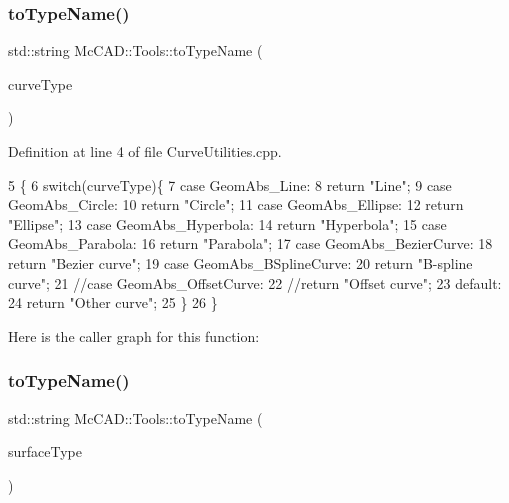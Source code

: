 \subsubsection{\texorpdfstring{to\+Type\+Name()}{toTypeName()}\hspace{0.1cm}{\footnotesize\ttfamily [1/2]}}
{\footnotesize\ttfamily std\+::string Mc\+C\+A\+D\+::\+Tools\+::to\+Type\+Name (\begin{DoxyParamCaption}\item[{Geom\+Abs\+\_\+\+Curve\+Type}]{curve\+Type }\end{DoxyParamCaption})}



Definition at line 4 of file Curve\+Utilities.\+cpp.


\begin{DoxyCode}
5                                     \{
6     \textcolor{keywordflow}{switch}(curveType)\{
7     \textcolor{keywordflow}{case} GeomAbs\_Line:
8         \textcolor{keywordflow}{return} \textcolor{stringliteral}{"Line"};
9     \textcolor{keywordflow}{case} GeomAbs\_Circle:
10         \textcolor{keywordflow}{return} \textcolor{stringliteral}{"Circle"};
11     \textcolor{keywordflow}{case} GeomAbs\_Ellipse:
12         \textcolor{keywordflow}{return} \textcolor{stringliteral}{"Ellipse"};
13     \textcolor{keywordflow}{case} GeomAbs\_Hyperbola:
14         \textcolor{keywordflow}{return} \textcolor{stringliteral}{"Hyperbola"};
15     \textcolor{keywordflow}{case} GeomAbs\_Parabola:
16         \textcolor{keywordflow}{return} \textcolor{stringliteral}{"Parabola"};
17     \textcolor{keywordflow}{case} GeomAbs\_BezierCurve:
18         \textcolor{keywordflow}{return} \textcolor{stringliteral}{"Bezier curve"};
19     \textcolor{keywordflow}{case} GeomAbs\_BSplineCurve:
20         \textcolor{keywordflow}{return} \textcolor{stringliteral}{"B-spline curve"};
21     \textcolor{comment}{//case GeomAbs\_OffsetCurve:}
22         \textcolor{comment}{//return "Offset curve";}
23     \textcolor{keywordflow}{default}:
24         \textcolor{keywordflow}{return} \textcolor{stringliteral}{"Other curve"};
25     \}
26 \}
\end{DoxyCode}
Here is the caller graph for this function\+:
\mbox{\label{namespaceMcCAD_1_1Tools_a9d065c1e584e08a0cf4def99482a9476}} 
\subsubsection{\texorpdfstring{to\+Type\+Name()}{toTypeName()}\hspace{0.1cm}{\footnotesize\ttfamily [2/2]}}
{\footnotesize\ttfamily std\+::string Mc\+C\+A\+D\+::\+Tools\+::to\+Type\+Name (\begin{DoxyParamCaption}\item[{Geom\+Abs\+\_\+\+Surface\+Type}]{surface\+Type }\end{DoxyParamCaption})}



